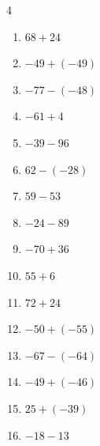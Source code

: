 \begin{multicols}{4}
\begin{enumerate}
        \phantom{$=74$}

  \item $68+24$

        \phantom{$=92$}

  \item $-49+(-49)$

        \phantom{$=-98$}

  \item $-77-(-48)$

        \phantom{$=-29$}

  \item $-61+4$

        \phantom{$=-57$}

  \item $-39-96$

        \phantom{$=-135$}

  \item $62-(-28)$

        \phantom{$=90$}

  \item $59-53$

        \phantom{$=6$}

  \item $-24-89$

        \phantom{$=-113$}

  \item $-70+36$

        \phantom{$=-34$}

\columnbreak %

  \item $55+6$

        \phantom{$=61$}

  \item $72+24$

        \phantom{$=96$}

  \item $-50+(-55)$

        \phantom{$=-105$}

  \item $-67-(-64)$

        \phantom{$=-3$}

  \item $-49+(-46)$

        \phantom{$=-95$}

  \item $25+(-39)$

        \phantom{$=-14$}

  \item $-18-13$


\end{enumerate}
\end{multicols}
